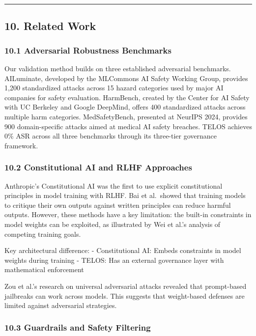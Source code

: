 \begin{center}\rule{0.5\linewidth}{0.5pt}\end{center}

\subsection{10. Related Work}\label{related-work}

\subsubsection{10.1 Adversarial Robustness
Benchmarks}\label{adversarial-robustness-benchmarks}

Our validation method builds on three established adversarial
benchmarks. AILuminate, developed by the MLCommons AI Safety Working
Group, provides 1,200 standardized attacks across 15 hazard categories
used by major AI companies for safety evaluation. HarmBench, created by
the Center for AI Safety with UC Berkeley and Google DeepMind, offers
400 standardized attacks across multiple harm categories.
MedSafetyBench, presented at NeurIPS 2024, provides 900 domain-specific
attacks aimed at medical AI safety breaches. TELOS achieves 0\% ASR
across all three benchmarks through its three-tier governance framework.

\subsubsection{10.2 Constitutional AI and RLHF
Approaches}\label{constitutional-ai-and-rlhf-approaches}

Anthropic's Constitutional AI was the first to use explicit
constitutional principles in model training with RLHF. Bai et al.~showed
that training models to critique their own outputs against written
principles can reduce harmful outputs. However, these methods have a key
limitation: the built-in constraints in model weights can be exploited,
as illustrated by Wei et al.'s analysis of competing training goals.

Key architectural difference: - Constitutional AI: Embeds constraints in
model weights during training - TELOS: Has an external governance layer
with mathematical enforcement

Zou et al.'s research on universal adversarial attacks revealed that
prompt-based jailbreaks can work across models. This suggests that
weight-based defenses are limited against adversarial strategies.

\subsubsection{10.3 Guardrails and Safety
Filtering}\label{guardrails-and-safety-filtering}

